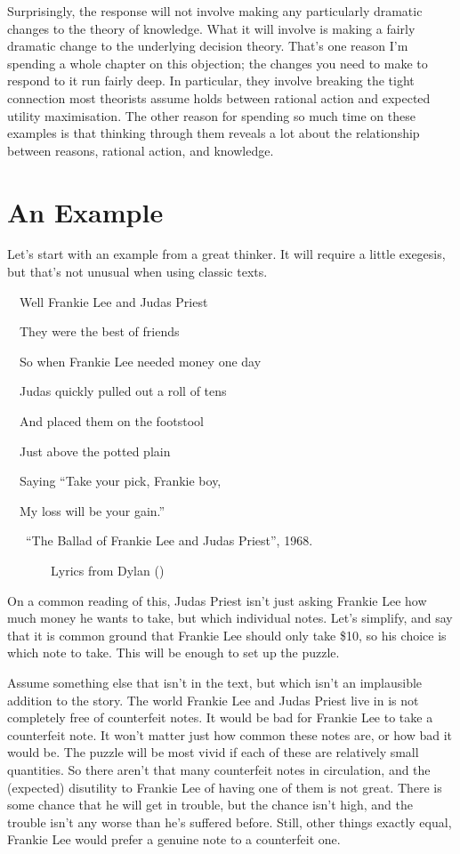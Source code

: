 \documentclass[
  10pt,
  letterpaper,
  twoside]{scrbook}
\begin{document}
Surprisingly, the response will not involve making any particularly
dramatic changes to the theory of knowledge. What it will involve is
making a fairly dramatic change to the underlying decision theory.
That's one reason I'm spending a whole chapter on this objection; the
changes you need to make to respond to it run fairly deep. In
particular, they involve breaking the tight connection most theorists
assume holds between rational action and expected utility maximisation.
The other reason for spending so much time on these examples is that
thinking through them reveals a lot about the relationship between
reasons, rational action, and knowledge.

\section{An Example}\label{sec-frankielee}

Let's start with an example from a great thinker. It will require a
little exegesis, but that's not unusual when using classic texts.

~~Well Frankie Lee and Judas Priest ~\\
\strut ~~They were the best of friends ~\\
\strut ~~So when Frankie Lee needed money one day ~\\
\strut ~~Judas quickly pulled out a roll of tens ~\\
\strut ~~And placed them on the footstool ~\\
\strut ~~Just above the potted plain ~\\
\strut ~~Saying ``Take your pick, Frankie boy, ~\\
\strut ~~My loss will be your gain.'' ~\\
\strut ~~~``The Ballad of Frankie Lee and Judas Priest'', 1968.\\
\strut ~~~~~~~Lyrics from Dylan ()

On a common reading of this, Judas Priest isn't just asking Frankie Lee
how much money he wants to take, but which individual notes. Let's
simplify, and say that it is common ground that Frankie Lee should only
take \$10, so his choice is which note to take. This will be enough to
set up the puzzle.

Assume something else that isn't in the text, but which isn't an
implausible addition to the story. The world Frankie Lee and Judas
Priest live in is not completely free of counterfeit notes. It would be
bad for Frankie Lee to take a counterfeit note. It won't matter just how
common these notes are, or how bad it would be. The puzzle will be most
vivid if each of these are relatively small quantities. So there aren't
that many counterfeit notes in circulation, and the (expected)
disutility to Frankie Lee of having one of them is not great. There is
some chance that he will get in trouble, but the chance isn't high, and
the trouble isn't any worse than he's suffered before. Still, other
things exactly equal, Frankie Lee would prefer a genuine note to a
counterfeit one.
\end{document}
